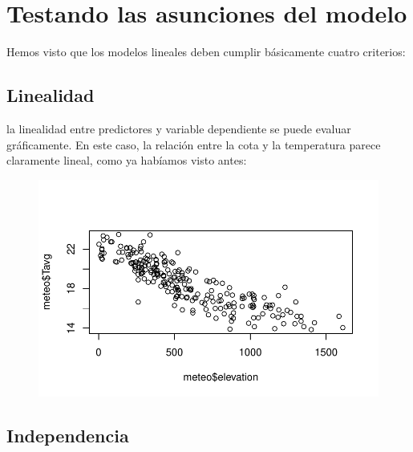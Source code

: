 \documentclass[
  letterpaper,
  DIV=11,
  numbers=noendperiod]{scrreprt}
\newenvironment{Shaded}{\begin{snugshade}}{\end{snugshade}}
\newcommand{\FunctionTok}[1]{\textcolor[rgb]{0.28,0.35,0.67}{#1}}
\newcommand{\NormalTok}[1]{\textcolor[rgb]{0.00,0.23,0.31}{#1}}
\newcommand{\SpecialCharTok}[1]{\textcolor[rgb]{0.37,0.37,0.37}{#1}}
\begin{document}
\hypertarget{testando-las-asunciones-del-modelo}{%
\section{Testando las asunciones del
modelo}\label{testando-las-asunciones-del-modelo}}

Hemos visto que los modelos lineales deben cumplir básicamente cuatro
criterios:

\hypertarget{linealidad}{%
\subsection{Linealidad}\label{linealidad}}

la linealidad entre predictores y variable dependiente se puede evaluar
gráficamente. En este caso, la relación entre la cota y la temperatura
parece claramente lineal, como ya habíamos visto antes:

\begin{Shaded}
\end{Shaded}

\begin{figure}[H]

{\centering \includegraphics{01_RegresionLineal_files/figure-pdf/unnamed-chunk-29-1.pdf}

}

\end{figure}

\hypertarget{independencia}{%
\subsection{Independencia}\label{independencia}}
\end{document}
